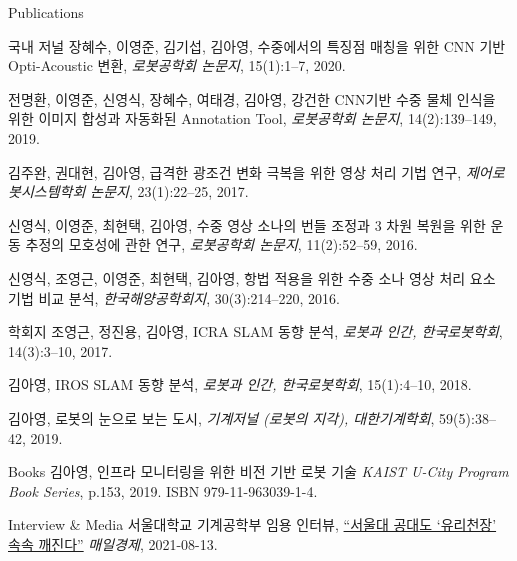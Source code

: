 \begin{rSection}{Publications}
{\begin{pubSubsectionNum}{국내 저널}
    장혜수, 이영준, 김기섭, 김아영,
    수중에서의 특징점 매칭을 위한 CNN 기반 Opti-Acoustic 변환,
    \textit{로봇공학회 논문지}, 15(1):1--7, 2020.

    전명환, 이영준, 신영식, 장혜수, 여태경, 김아영,
    강건한 CNN기반 수중 물체 인식을 위한 이미지 합성과 자동화된 Annotation Tool,
    \textit{로봇공학회 논문지}, 14(2):139--149, 2019.

    김주완, 권대현, 김아영,
    급격한 광조건 변화 극복을 위한 영상 처리 기법 연구,
    \textit{제어로봇시스템학회 논문지}, 23(1):22--25, 2017.

  	신영식, 이영준, 최현택, 김아영,
  	수중 영상 소나의 번들 조정과 3 차원 복원을 위한 운동 추정의 모호성에 관한 연구,
  	\textit{로봇공학회 논문지}, 11(2):52--59, 2016.

  	신영식, 조영근, 이영준, 최현택, 김아영,
  	항법 적용을 위한 수중 소나 영상 처리 요소 기법 비교 분석,
  	\textit{한국해양공학회지}, 30(3):214--220, 2016.
  \end{pubSubsectionNum}

  \begin{pubSubsectionNum}{학회지}
    조영근, 정진용, 김아영,
    ICRA SLAM 동향 분석,
    \textit{로봇과 인간, 한국로봇학회}, 14(3):3--10, 2017.

    김아영,
    IROS SLAM 동향 분석,
    \textit{로봇과 인간, 한국로봇학회}, 15(1):4--10, 2018.

    김아영,
    로봇의 눈으로 보는 도시,
    \textit{기계저널 (로봇의 지각), 대한기계학회}, 59(5):38--42, 2019.

  \end{pubSubsectionNum}

  \begin{pubSubsectionNum}{Books}
    김아영,
    인프라 모니터링을 위한 비전 기반 로봇 기술
    \textit{KAIST U-City Program Book Series}, p.153, 2019. ISBN 979-11-963039-1-4.

  \end{pubSubsectionNum}

  \begin{pubSubsectionNum}{Interview \& Media}
    서울대학교 기계공학부 임용 인터뷰,
    \hyperlink{https://www.mk.co.kr/news/society/view/2021/08/787393/}{``서울대 공대도 `유리천장' 속속 깨진다''}
    \textit{매일경제}, 2021-08-13.


\end{pubSubsectionNum}}
\end{rSection}
